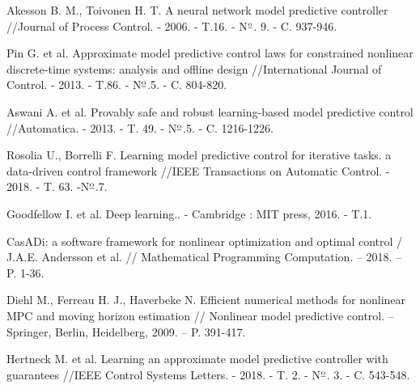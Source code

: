 \begin{biblio}
Akesson B. M., Toivonen H. T. A neural network model predictive controller //Journal of Process Control. - 2006. - T.16. - N$\textsuperscript{\underline{o}}$. 9. - C. 937-946.

Pin G. et al. Approximate model predictive control laws for constrained nonlinear discrete-time systems: analysis and offline design //International Journal of Control. - 2013. - T.86. - N$\textsuperscript{\underline{o}}$.5. - C. 804-820.

Aswani A. et al. Provably safe and robust learning-based model predictive control //Automatica. - 2013. - T. 49. - N$\textsuperscript{\underline{o}}$.5. - C. 1216-1226.

Rosolia U., Borrelli F. Learning model predictive control for iterative tasks. a data-driven control framework //IEEE Transactions on Automatic Control. - 2018. - T. 63. -N$\textsuperscript{\underline{o}}$.7.

Goodfellow I. et al. Deep learning.. - Cambridge : MIT press, 2016. - T.1.

CasADi: a software framework for nonlinear optimization and optimal control / J.A.E. Andersson  et al. // Mathematical Programming Computation. -- 2018. -- P. 1-36.

Diehl M., Ferreau H. J., Haverbeke N. Efficient numerical methods for nonlinear MPC and moving horizon estimation // Nonlinear model predictive control. -- Springer, Berlin, Heidelberg, 2009. -- P. 391-417.

Hertneck M. et al. Learning an approximate model predictive controller with guarantees //IEEE Control Systems Letters. - 2018. - T. 2. - N$\textsuperscript{\underline{o}}$. 3. - C. 543-548.

\end{biblio} 